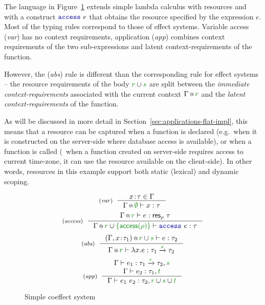 The language in Figure~\ref{fig:path-coeff} extends simple lambda calculus with resources and
with a construct $\kvd{access}~e$ that obtains the resource specified by the expression $e$.
Most of the typing rules correspond to those of effect systems. Variable access (\emph{var}) 
has no context requirements, application (\emph{app}) combines context requirements of the two
sub-expressions and latent context-requirements of the function. 

However, the (\emph{abs}) rule is different than the corresponding rule for effect systems -- the
resource requirements of the body $\cclrd{r} \cup \cclrd{s}$ are split between the \emph{immediate 
context-requirements} associated with the current context $\coctx{\Gamma}{\cclrd{r}}$ and the 
\emph{latent context-requirements} of the function.

As will be discussed in more detail in Section~\ref{sec:applications-flat-impl}, this means that a 
resource can be captured when a function is declared (e.g.~when it is constructed on the 
server-side where database access is available), or when a function is called (\eg~when a function 
created on server-side requires access to current time-zone, it can use the resource available on
 the client-side). In other words, resources in this example support both static (lexical) and
 dynamic scoping.


\begin{figure}[t]
\begin{equation*}
\tyrule{var}
  {x\!:\!\tau \in \Gamma }
  {\coctx{\Gamma}{\cclrd{\emptyset}} \vdash x : \tau }
\end{equation*} 
\begin{equation*}
\tyrule{access}
  {\coctx{\Gamma}{\cclrd{r}} \vdash e : \ident{res}_\rho~\tau }
  {\coctx{\Gamma}{\cclrd{r} \cup \cclrd{ \{\ident{access}(\rho)\} }} \vdash \kvd{access}~e : \tau }
\end{equation*}
\begin{equation*}
\tyrule{abs}
  {\coctx{(\Gamma, x\!:\!\tau_1)}{\cclrd{r} \cup \cclrd{s}} \vdash e : \tau_2 }
  {\coctx{\Gamma}{\cclrd{r}} \vdash \lambda x.e : \tau_1 \xrightarrow{\cclrd{s}} \tau_2}
\end{equation*}
\begin{equation*}
\tyrule{app}
  {\Gamma \vdash e_1 : \tau_1 \xrightarrow{\cclrd{r}} \tau_2, \cclrd{s} \\
   \Gamma \vdash e_2 : \tau_1, \cclrd{t} }
  {\Gamma \vdash e_1~e_2 : \tau_2, \cclrd{r}\cup\cclrd{s}\cup\cclrd{t}  }
\end{equation*}

\caption{Simple coeffect system}
\label{fig:path-coeff}
\end{figure}

